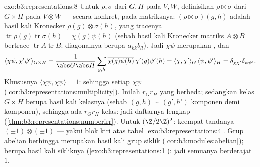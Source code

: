 \begin{solution}{exo:b3:representations:8}
Untuk  $\rho, \sigma$ dari $G, H$ pada $V, W$, definisikan
 $\rho \boxtimes \sigma$ dari $G \times H$ pada
$V \otimes W$ --- secara konkret, pada matriksnya: $(\rho\boxtimes
\sigma)(g,h)$ adalah hasil kali Kronecker $\rho(g)\otimes
\sigma(h)$, yang tracenya
$\operatorname{tr}\rho(g)\operatorname{tr}\sigma(h) =
\chi(g)\psi(h)$ (sebab hasil kali Kronecker matriks $A \otimes B$
bertrace $\operatorname{tr}A\operatorname{tr}B$: diagonalnya
berupa $a_{kk}b_{ll}$). Jadi $\chi\psi$ merupakan , dan
\[
\langle\chi\psi, \chi'\psi'\rangle_{G\times H}
= \frac{1}{\abs G\abs H}\sum_{g,h}
\overline{\chi(g)\psi(h)}\,\chi'(g)\psi'(h)
= \langle\chi,\chi'\rangle_G\,\langle\psi,\psi'\rangle_H
= \delta_{\chi\chi'}\delta_{\psi\psi'}.
\]
Khususnya $\langle\chi\psi,\chi\psi\rangle = 1$: sehingga setiap
$\chi\psi$ 
(\cref{cor:b3:representations:multiplicity}). Inilah
$r_Gr_H$   yang berbeda; sedangkan kelas
$G\times H$ berupa hasil kali kelasnya (sebab $(g,h) \sim (g',h')$
komponen demi komponen), sehingga ada $r_Gr_H$ kelas: jadi daftarnya
lengkap (\cref{thm:b3:representations:numberirr}). Untuk
$(\Z/2\Z)^2$: keempat  tandanya
$(\pm1)\otimes(\pm1)$ --- yakni blok kiri atas tabel
\cref{exo:b3:representations:4}. Grup abelian
berhingga merupakan hasil kali grup siklik
(\cref{cor:b3:modules:abelian});   berupa
hasil kali  sikliknya (\cref{exo:b3:representations:1}):
jadi semuanya berderajat $1$.
\end{solution}

